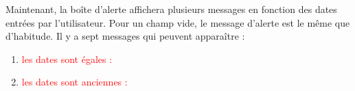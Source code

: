 \documentclass{article}
\begin{document}
\begin{enumerate}
               \vspace{0.7cm}
               \hspace*{-0.7in}
               \noindent{}
  
  
  
  
  Maintenant, la boîte d'alerte affichera plusieurs messages en fonction des dates entrées par l'utilisateur. Pour un champ vide, le message d'alerte est le même que d'habitude. Il y a sept messages qui peuvent apparaître :
  
  \begin{enumerate}
 
 
  \item \textcolor{red}{les dates sont égales :} 
  \vspace{0.7cm}
               \hspace*{-0.7in}

               \noindent{}
               \newpage
  \item \textcolor{red}{les dates sont anciennes :} 
  \vspace{0.7cm}
               \hspace*{-0.7in}


\end{enumerate}
\end{enumerate}
\end{document}
